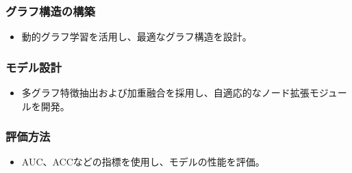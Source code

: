 \documentclass[twocolumn]{article}
\begin{document}
\subsubsection{グラフ構造の構築}
\begin{itemize}
	\item 	動的グラフ学習を活用し、最適なグラフ構造を設計。
\end{itemize}
\subsubsection{モデル設計}
\begin{itemize}
	\item 	多グラフ特徴抽出および加重融合を採用し、自適応的なノード拡張モジュールを開発。
\end{itemize}
\subsubsection{評価方法}
\begin{itemize}
	\item 	AUC、ACCなどの指標を使用し、モデルの性能を評価。
\end{itemize}



\iffalse
	\section*{Acknowledage}
	We would like to express our sincere gratitude to the National Cancer Institute Cancer Imaging Program for generously making their high-quality medical imaging dataset available and authorized for use on the Internet, providing indispensable resources for the smooth conduct of this research.
\fi



\end{document}
